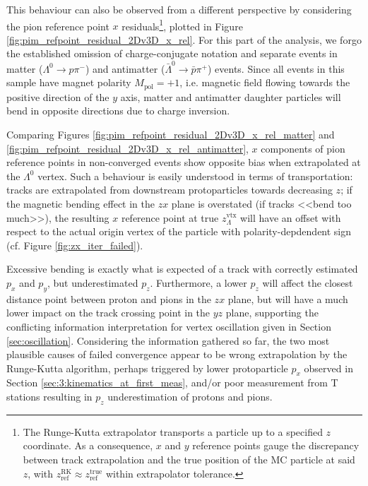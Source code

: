 This behaviour can also be observed from a different perspective by considering the pion reference point $x$ residuals\footnote{The Runge-Kutta extrapolator transports a particle up to a specified $z$ coordinate. As a consequence, $x$ and $y$ reference points gauge the discrepancy between track extrapolation and the true position of the MC particle at said $z$, with $z_\text{ref}^\text{RK} \approx z_\text{ref}^\text{true}$ within extrapolator tolerance.}, plotted in Figure \ref{fig:pim_refpoint_residual_2Dv3D_x_rel}.
For this part of the analysis, we forgo the established omission of charge-conjugate notation and separate events in matter ($\Lambda^0 \rightarrow p\pi^-$) and antimatter ($\bar{\Lambda}^0 \rightarrow \bar{p}\pi^+$) events.
Since all events in this sample have magnet polarity $M_\text{pol} = +1$, i.e. magnetic field flowing towards the positive direction of the $y$ axis,
matter and antimatter daughter particles will bend in opposite directions due to charge inversion.

Comparing Figures \ref{fig:pim_refpoint_residual_2Dv3D_x_rel_matter} and \ref{fig:pim_refpoint_residual_2Dv3D_x_rel_antimatter}, $x$ components of pion reference points in non-converged events show opposite bias when extrapolated at the $\Lambda^0$ vertex.
Such a behaviour is easily understood in terms of transportation: tracks are extrapolated from downstream protoparticles towards decreasing $z$;
if the magnetic bending effect in the $zx$ plane is overstated (if tracks <<bend too much>>), the resulting $x$ reference point at true $z_\Lambda^\text{vtx}$ will have an offset with respect to the actual origin vertex of the particle with polarity-depdendent sign (cf. Figure \ref{fig:zx_iter_failed}).

Excessive bending is exactly what is expected of a track with correctly estimated $p_x$ and $p_y$, but underestimated $p_z$.
Furthermore, a lower $p_z$ will affect the closest distance point between proton and pions in the $zx$ plane, but will have a much lower impact on the track crossing point in the $yz$ plane,
supporting the conflicting information interpretation for vertex oscillation given in Section \ref{sec:oscillation}.
Considering the information gathered so far, the two most plausible causes of failed convergence appear to be wrong extrapolation by the Runge-Kutta algorithm, perhaps triggered by lower protoparticle $p_x$ observed in Section \ref{sec:3:kinematics_at_first_meas}, and/or poor measurement from T stations resulting in $p_z$ underestimation of protons and pions.


